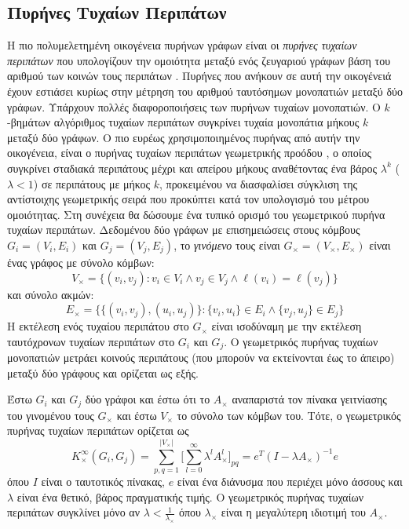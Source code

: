 \subsection{Πυρήνες Τυχαίων Περιπάτων}
\label{ssec:rw}
Η πιο πολυμελετημένη οικογένεια πυρήνων γράφων είναι οι \textit{πυρήνες τυχαίων περιπάτων} που υπολογίζουν την ομοιότητα μεταξύ ενός ζευγαριού γράφων βάση του αριθμού των κοινών τους περιπάτων \cite{kashima2003marginalized,gartner2003graph,mahe2004extensions,borgwardt2005protein,vishwanathan2010graph,sugiyama2015halting}.
Πυρήνες που ανήκουν σε αυτή την οικογένειά έχουν εστιάσει κυρίως στην μέτρηση του αριθμού ταυτόσημων μονοπατιών μεταξύ δύο γράφων.
Υπάρχουν πολλές διαφοροποιήσεις των πυρήνων τυχαίων μονοπατιών.
Ο $k$-βημάτων αλγόριθμος τυχαίων περιπάτων συγκρίνει τυχαία μονοπάτια μήκους $k$ μεταξύ δύο γράφων.
Ο πιο ευρέως χρησιμοποιημένος πυρήνας από αυτήν την οικογένεια, είναι ο πυρήνας τυχαίων περιπάτων γεωμετρικής προόδου \cite{gartner2003graph}, ο οποίος συγκρίνει σταδιακά περιπάτους μέχρι και απείρου μήκους αναθέτοντας ένα βάρος $\lambda^k$ ($\lambda < 1$) σε περιπάτους με μήκος $k$, προκειμένου να διασφαλίσει σύγκλιση της αντίστοιχης γεωμετρικής σειρά που προκύπτει κατά τον υπολογισμό του μέτρου ομοιότητας.
Στη συνέχεια θα δώσουμε ένα τυπικό ορισμό του γεωμετρικού πυρήνα τυχαίων περιπάτων.
Δεδομένου δύο γράφων με επισημειώσεις στους κόμβους $G_i=(V_i,E_i)$ και $G_j=(V_j,E_j)$, το \textit{γινόμενο} τους είναι $G_\times=(V_\times,E_\times)$ είναι ένας γράφος με σύνολο κόμβων:
\begin{equation}
	V_{\times} = \{(v_i,v_j) : v_i \in V_i \wedge v_j \in V_j \wedge \ell(v_i) = \ell(v_j) \} 
\end{equation}
και σύνολο ακμών:
\begin{equation}
	E_{\times} = \{\{(v_i,v_j),(u_i,u_j)\} : \{v_i,u_i\} \in E_i \wedge \{v_j,u_j\} \in E_j\}
\end{equation}
Η εκτέλεση ενός τυχαίου περιπάτου στο $G_{\times}$ είναι ισοδύναμη με την εκτέλεση ταυτόχρονων τυχαίων περιπάτων στο $G_i$ και $G_j$.
Ο γεωμετρικός πυρήνας τυχαίων μονοπατιών μετράει κοινούς περιπάτους (που μπορούν να εκτείνονται έως το άπειρο) μεταξύ δύο γράφους και ορίζεται ως εξής.
\begin{definition}
	Έστω $G_i$ και $G_j$ δύο γράφοι και έστω ότι το $A_\times$ αναπαριστά τον πίνακα γειτνίασης του γινομένου τους $G_\times$ και έστω $V_\times$ το σύνολο των κόμβων του.
	Τότε, ο γεωμετρικός πυρήνας τυχαίων περιπάτων ορίζεται ως
	\begin{equation}
    	K_{\times}^{\infty}(G_i,G_j) = \sum_{p,q=1}^{|V_{\times}|} \Big[ \sum_{l=0}^{\infty} \lambda^l A_{\times}^l \Big]_{pq} = e^T(I - \lambda A_{\times})^{-1} e
    \end{equation}
	όπου $I$ είναι ο ταυτοτικός πίνακας, $e$ είναι ένα διάνυσμα που περιέχει μόνο άσσους και $\lambda$ είναι ένα θετικό, βάρος πραγματικής τιμής.
	Ο γεωμετρικός πυρήνας τυχαίων περιπάτων συγκλίνει μόνο αν  $\lambda < \frac{1}{\lambda_\times}$ όπου $\lambda_\times$ είναι η μεγαλύτερη ιδιοτιμή του $A_{\times}$.
\end{definition}
